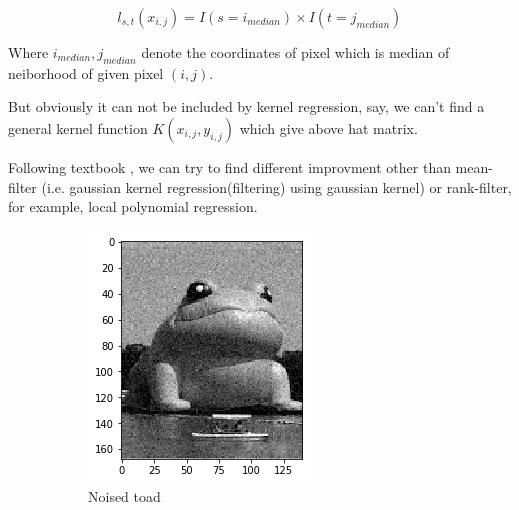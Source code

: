 \documentclass{article}
\begin{document}
$$ 
l_{s,t}(x_{i,j}) = I(s=i_{median}) \times I(t=j_{median}) 
$$

Where $i_{median},j_{median}$ denote the coordinates of pixel which is median of neiborhood of given pixel $(i,j)$.

But obviously it can not be included by kernel regression, say, 
we can't find a general kernel function $K(x_{i,j},y_{i,j})$ which give above hat matrix. 

Following textbook \cite{wasserman2006all}, we can try to find different improvment other than mean-filter 
(i.e. gaussian kernel regression(filtering) using gaussian kernel) or rank-filter, 
for example, local polynomial regression. 

\begin{figure}[htb]
  \centering
  \begin{subfigure}[b]{0.24\linewidth}
    \includegraphics[width=\linewidth]{images/noise_removal_1.png}
    \caption{Noised toad}
  \end{subfigure}
  \begin{subfigure}[b]{0.24\linewidth}

\end{subfigure}
\end{figure}
\end{document}
